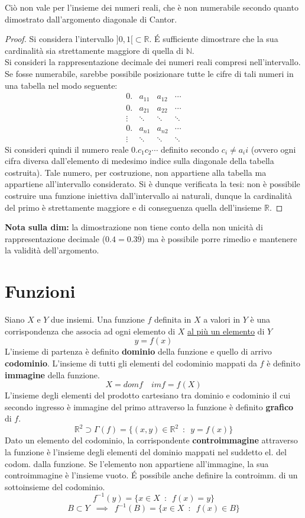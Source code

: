 \documentclass[10pt, oneside]{book}
\theoremstyle{plain}
\begin{document}
Ciò non vale per l'insieme dei numeri reali, che è non numerabile secondo quanto dimostrato dall'argomento diagonale di Cantor.
\begin{proof}
    Si considera l'intervallo $]0,1[ \subset \mathbb{R}$. \'E sufficiente dimostrare che la sua cardinalità sia strettamente maggiore di quella di $\mathbb{N}$.
    \\Si consideri la rappresentazione decimale dei numeri reali compresi nell'intervallo. Se fosse numerabile, sarebbe possibile posizionare tutte le cifre di tali numeri in una tabella nel modo seguente:
    \[\begin{matrix}
    0. & a_{11} & a_{12} & \cdots \\
    0. & a_{21} & a_{22} & \cdots \\
    \vdots & \ddots & \ddots & \ddots \\
    0. & a_{n1} & a_{n2} & \cdots \\
    \vdots & \ddots & \ddots & \ddots
    \end{matrix}\]
    Si consideri quindi il numero reale $0.c_1 c_2 \cdots$ definito secondo $c_i \neq a_ii$ (ovvero ogni cifra diversa dall'elemento di medesimo indice sulla diagonale della tabella costruita). Tale numero, per costruzione, non appartiene alla tabella ma appartiene all'intervallo considerato. Si è dunque verificata la tesi: non è possibile costruire una funzione iniettiva dall'intervallo ai naturali, dunque la cardinalità del primo è strettamente maggiore e di conseguenza quella dell'insieme $\mathbb{R}$.
\end{proof}
\textbf{Nota sulla dim: } la dimostrazione non tiene conto della non unicità di rappresentazione decimale ($0.4 = 0.3\overline{9}$) ma è possibile porre rimedio e mantenere la validità dell'argomento.


\chapter{Funzioni}
\begin{defin}
Siano $X$ e $Y$ due insiemi. Una funzione $f$ definita in $X$ a valori in $Y$ è una corrispondenza che associa ad ogni elemento di $X$ \underline{al più un elemento} di $Y$
\[y = f(x)\]
L'insieme di partenza è definito \textbf{dominio} della funzione e quello di arrivo \textbf{codominio}. L'insieme di tutti gli elementi del codominio mappati da $f$ è definito \textbf{immagine} della funzione.
\[X = dom f \quad im f = f(X)\]
L'insieme degli elementi del prodotto cartesiano tra dominio e codominio il cui secondo ingresso è immagine del primo attraverso la funzione è definito \textbf{grafico} di $f$.
\[\mathbb{R}^2 \supset \Gamma (f) = \{(x,y) \in \mathbb{R}^2 \enspace : \enspace y = f(x) \}\]
Dato un elemento del codominio, la corrispondente \textbf{controimmagine} attraverso la funzione è l'insieme degli elementi del dominio mappati nel suddetto el. del codom. dalla funzione. Se l'elemento non appartiene all'immagine, la sua controimmagine è l'insieme vuoto. \'E possibile anche definire la controimm. di un sottoinsieme del codominio.
\[f^{-1}(y) = \{x \in X \enspace : \enspace f(x) = y\}\] \[B \subset Y \enspace \implies \enspace f^{-1}(B) = \{x \in X \enspace : \enspace f(x) \in B\}\]
\end{defin}
\end{document}
